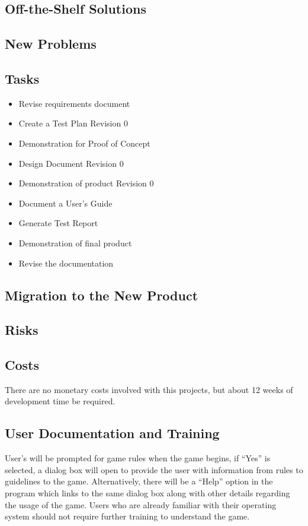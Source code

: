 \documentclass[12pt]{article}
\begin{document}
	\subsection{Off-the-Shelf Solutions}
	\subsection{New Problems}
	\subsection{Tasks}
	\begin{itemize}	
	\item 	Revise requirements document
	\item 	Create a Test Plan Revision 0 
	\item 	Demonstration for Proof of Concept
	\item 	Design Document Revision 0
	\item 	Demonstration of product Revision 0
	\item 	Document a User’s Guide 
	\item 	Generate Test Report 
	\item 	Demonstration of final product
	\item 	Revise the documentation
	\end{itemize}
	
	\subsection{Migration to the New Product}
	\subsection{Risks}
	\subsection{Costs}
	There are no monetary costs involved with this projects, but about 12 weeks of 				development time be required.
	\subsection{User Documentation and Training}
	User’s will be prompted for game rules when the game begins, if “Yes” is selected, a 		dialog box will open to provide the user with information from rules to guidelines to 		the game. Alternatively, there will be a “Help” option in the program which links to 		the same dialog box along with other details regarding the usage of the game. Users who 	are already familiar with their operating system should not require further training to 	understand the game. 
\end{document}
